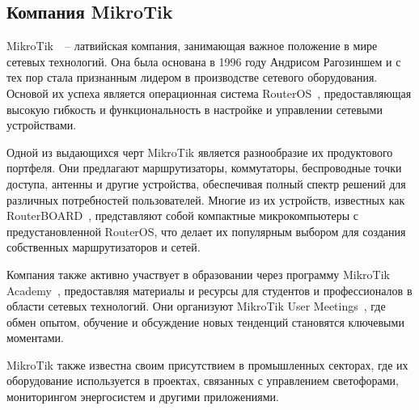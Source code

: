 \subsection{Компания MikroTik}

MikroTik~\cite{mikrotik}~-- латвийская компания, занимающая важное положение в мире сетевых технологий. Она была основана в 1996 году Андрисом Рагозиншем и с тех пор стала признанным лидером в производстве сетевого оборудования. Основой их успеха является операционная система RouterOS~\cite{router_os}, предоставляющая высокую гибкость и функциональность в настройке и управлении сетевыми устройствами.

Одной из выдающихся черт MikroTik является разнообразие их продуктового портфеля. Они предлагают маршрутизаторы, коммутаторы, беспроводные точки доступа, антенны и другие устройства, обеспечивая полный спектр решений для различных потребностей пользователей. Многие из их устройств, известных как RouterBOARD~\cite{routerboard}, представляют собой компактные микрокомпьютеры с предустановленной RouterOS, что делает их популярным выбором для создания собственных маршрутизаторов и сетей.

Компания также активно участвует в образовании через программу MikroTik Academy~\cite{mikrotik_academy}, предоставляя материалы и ресурсы для студентов и профессионалов в области сетевых технологий. Они организуют MikroTik User Meetings~\cite{mum_mikrotik}, где обмен опытом, обучение и обсуждение новых тенденций становятся ключевыми моментами.

MikroTik также известна своим присутствием в промышленных секторах, где их оборудование используется в проектах, связанных с управлением светофорами, мониторингом энергосистем и другими приложениями.




